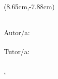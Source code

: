 \begin{titlepage}
\vfill

\begin{textblock*}{7.35cm}(8.65cm,-7.88cm)%
\begin{flushleft}
 {\ArialBoldItalicMT\fontsize{12pt}{14pt}
 {\addfontfeature{}
 {\MakeUppercase\tipotrabajo}}}\\[0.49cm]
 {\ArialMT\fontsize{12pt}{14pt}
 {\addfontfeature{}
 Autor/a:}}\\ 
 {\ArialBoldMT\fontsize{12pt}{14pt}
 {\addfontfeature{}
 {\miNombre}}}\\[0.5cm]
 {\ArialMT\fontsize{12pt}{14pt}
 {\addfontfeature{}
 Tutor/a:}}\\
 {\ArialBoldMT\fontsize{12pt}{14pt}
 {\addfontfeature{}
 {\miTutor}}}\\[0.49cm]
 {\ArialBoldItalicMT\fontsize{12pt}{14pt}
 {\addfontfeature{}
 {\MakeUppercase \miUbicacion, \number\year}}}
\end{flushleft}
\end{textblock*}



\end{titlepage} %

\restoregeometry


